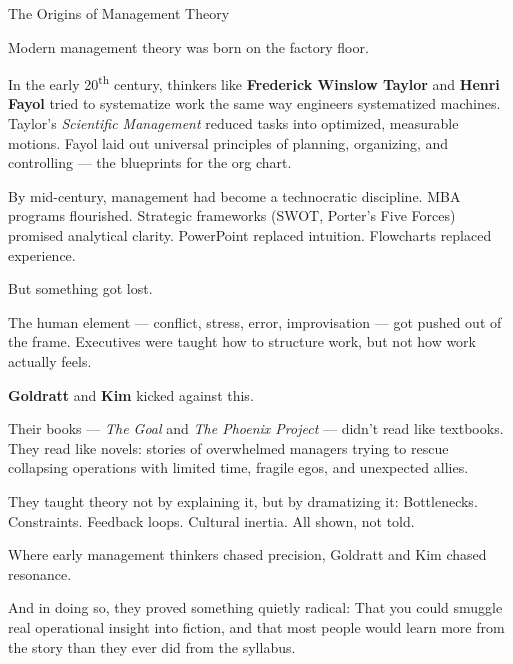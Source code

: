 \begin{HistoricalSidebar}{The Origins of Management Theory}

  Modern management theory was born on the factory floor.

  \medskip
  
  In the early 20\textsuperscript{th} century, thinkers like \textbf{Frederick Winslow Taylor} and \textbf{Henri Fayol} tried to systematize work the same way engineers systematized machines.  
  Taylor’s \textit{Scientific Management} reduced tasks into optimized, measurable motions.  
  Fayol laid out universal principles of planning, organizing, and controlling — the blueprints for the org chart.

  \medskip
  
  By mid-century, management had become a technocratic discipline.  
  MBA programs flourished. Strategic frameworks (SWOT, Porter’s Five Forces) promised analytical clarity.  
  PowerPoint replaced intuition. Flowcharts replaced experience.
  
  \medskip
  
  But something got lost.

  \medskip
  
  The human element — conflict, stress, error, improvisation — got pushed out of the frame.  
  Executives were taught how to structure work, but not how work actually feels.
  
  \medskip
  
  \textbf{Goldratt} and \textbf{Kim} kicked against this.

  \medskip
  
  Their books — \textit{The Goal} and \textit{The Phoenix Project} — didn’t read like textbooks.  
  They read like novels: stories of overwhelmed managers trying to rescue collapsing operations with limited time, 
  fragile egos, and unexpected allies.

  \medskip
  
  They taught theory not by explaining it, but by dramatizing it:  
  Bottlenecks. Constraints. Feedback loops. Cultural inertia.  
  All shown, not told.
  
  \medskip
  
  Where early management thinkers chased precision, Goldratt and Kim chased resonance.

  \medskip
  
  And in doing so, they proved something quietly radical:  
  That you could smuggle real operational insight into fiction, and that most people would learn more from the story than 
  they ever did from the syllabus.
  
\end{HistoricalSidebar}

